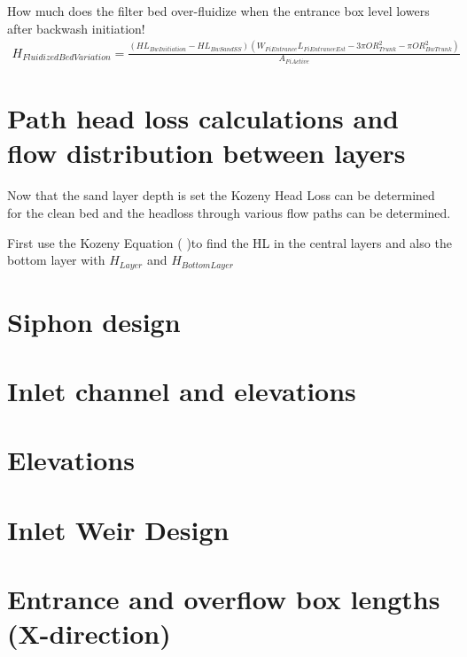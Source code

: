 \documentclass[letterpaper,10pt,english]{sphinxmanual}
\begin{document}
How much does the filter bed over-fluidize when the entrance box level lowers after backwash initiation!
\begin{equation}\label{equation:Filtration/Filtration_Derivations:Filtration/Filtration_Derivations:63}
\begin{split}H_{FluidizedBedVariation} = \frac{(HL_{BwInitiation}-HL_{BwSandSS})(W_{FiEntrance}L_{FiEntranceEst} - 3 \pi OR_{Trunk}^2 - \pi OR_{BwTrunk}^2)}{A_{FiActive}}\end{split}
\end{equation}

\section{Path head loss calculations and flow distribution between layers}
\label{\detokenize{Filtration/Filtration_Derivations:path-head-loss-calculations-and-flow-distribution-between-layers}}
Now that the sand layer depth is set the Kozeny Head Loss can be determined for the clean bed and the headloss through various flow paths can be determined.

First use the Kozeny Equation ( )to find the HL in the central layers and also the bottom layer with \(H_{Layer}\) and \(H_{BottomLayer}\)


\section{Siphon design}
\label{\detokenize{Filtration/Filtration_Derivations:siphon-design}}

\section{Inlet channel and elevations}
\label{\detokenize{Filtration/Filtration_Derivations:inlet-channel-and-elevations}}

\section{Elevations}
\label{\detokenize{Filtration/Filtration_Derivations:elevations}}

\section{Inlet Weir Design}
\label{\detokenize{Filtration/Filtration_Derivations:inlet-weir-design}}

\section{Entrance and overflow box lengths (X-direction)}
\label{\detokenize{Filtration/Filtration_Derivations:entrance-and-overflow-box-lengths-x-direction}}
\end{document}
